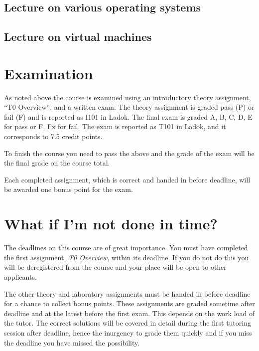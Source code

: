 \documentclass[a4paper,logo]{miunart}
\begin{document}
%

\subsection{Lecture on various operating systems}


\subsection{Lecture on virtual machines}


%


\section{Examination}
\label{sec:exam}
As noted above the course is examined using an introductory theory assignment, 
``T0 Overview'', and a written exam.
The theory assignment is graded pass (P) or fail (F) and is reported as I101 in 
Ladok.
The final exam is graded A, B, C, D, E for pass or F, Fx for fail.
The exam is reported as T101 in Ladok, and it corresponds to 7.5 credit points.

To finish the course you need to pass the above and the grade of the exam will 
be the final grade on the course total.

Each completed assignment, which is correct and handed in before deadline, will 
be awarded one bonus point for the exam.


\section{What if I'm not done in time?}
\label{sec:late}
The deadlines on this course are of great importance.
You must have completed the first assignment, \emph{T0 Overview}, within its 
deadline.
If you do not do this you will be deregistered from the course and your place 
will be open to other applicants.

The other theory and laboratory assignments must be handed in before deadline 
for a chance to collect bonus points.
These assignments are graded sometime after deadline and at the latest before 
the first exam.
This depends on the work load of the tutor.
The correct solutions will be covered in detail during the first tutoring 
session after deadline, hence the inurgency to grade them quickly and if you 
miss the deadline you have missed the possibility.
\end{document}
